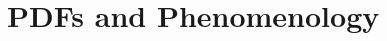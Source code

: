 \documentclass[aspectratio=169,9pt]{beamer}
\begin{document}





\section*{PDFs and Phenomenology}
\end{document}
